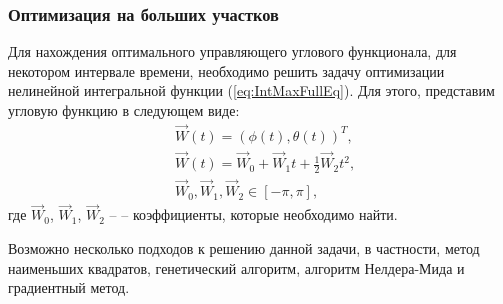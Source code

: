 \subsubsection{Оптимизация на больших участков}
\noindent\indent Для нахождения оптимального управляющего углового функционала,
для некотором интервале времени, необходимо решить задачу оптимизации нелинейной
интегральной функции (\ref{eq:IntMaxFullEq}). Для этого, представим угловую функцию
в следующем виде:
\begin{equation}
  \begin{aligned}
    & \vec{W}(t) = (\phi(t), \theta(t))^T, \\
    & \vec{W}(t) = \vec{W}_0 + \vec{W}_1 t + \frac{1}{2}\vec{W}_2 t^2, \\
    & \vec{W}_0, \vec{W}_1, \vec{W}_2 \in [-\pi, \pi],
  \end{aligned}
\end{equation}
где $\vec{W}_0$, $\vec{W}_1$, $\vec{W}_2$ -- -- коэффициенты, которые необходимо найти.\par
  Возможно несколько подходов к решению данной задачи, в частности, метод наименьших
квадратов, генетический алгоритм, алгоритм Нелдера-Мида и градиентный метод.

